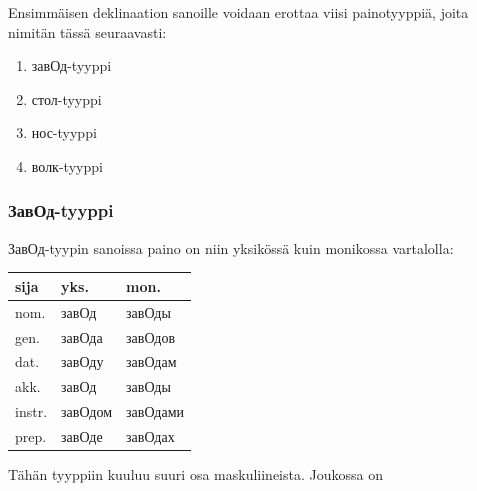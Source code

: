 \documentclass[]{scrreprt}
\providecommand{\tightlist}{%
  \setlength{\itemsep}{0pt}\setlength{\parskip}{0pt}}
\begin{document}
Ensimmäisen deklinaation sanoille voidaan erottaa viisi painotyyppiä,
joita nimitän tässä seuraavasti:

\begin{enumerate}
\def\labelenumi{\arabic{enumi}.}
\tightlist
\item
  завОд-tyyppi
\item
  стол-tyyppi
\item
  нос-tyyppi
\item
  волк-tyyppi
\end{enumerate}

\subsubsection{ЗавОд-tyyppi}\label{ux437ux430ux432ux43eux434-tyyppi}

ЗавОд-tyypin sanoissa paino on niin yksikössä kuin monikossa vartalolla:

\begin{longtable}[c]{@{}lll@{}}
\toprule
sija & yks. & mon.\tabularnewline
\midrule
\endhead
nom. & завОд & завОды\tabularnewline
gen. & завОда & завОдов\tabularnewline
dat. & завОду & завОдам\tabularnewline
akk. & завОд & завОды\tabularnewline
instr. & завОдом & завОдами\tabularnewline
prep. & завОде & завОдах\tabularnewline
\bottomrule
\end{longtable}

Tähän tyyppiin kuuluu suuri osa maskuliineista. Joukossa on
\end{document}

